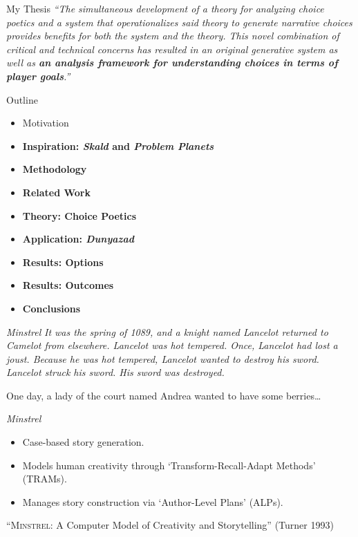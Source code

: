 \documentclass[xcolor=x11names]{beamer}
\def\dunyazad/{\textit{Dunyazad}}
\def\minstrel/{\textit{Minstrel}}
\def\skald/{\textit{Skald}}
\def\problemplanets/{\textit{Problem Planets}}
\begin{document}
\begin{frame}{My Thesis}
  \justifying
  \itshape
  ``The simultaneous development of a theory for analyzing choice poetics and a system that operationalizes said theory to generate narrative choices provides benefits for both the system and the theory. This novel combination of critical and technical concerns has resulted in an original generative system as well as \textbf{an analysis framework for understanding choices in terms of player goals}.''
\end{frame}

\begin{frame}{Outline}
  \begin{itemize}
    \item Motivation
    \item \textbf{Inspiration: \skald/ and \problemplanets/}
    \item \textbf{Methodology}
    \item \textbf{Related Work}
    \item \textbf{Theory: Choice Poetics}
    \item \textbf{Application: \dunyazad/}
    \item \textbf{Results: Options}
    \item \textbf{Results: Outcomes}
    \item \textbf{Conclusions}
  \end{itemize}
\end{frame}

\begin{frame}{\minstrel/}
  \justifying
  \setlength{\parindent}{1.5em}
  \itshape
  It was the spring of 1089, and a knight named Lancelot returned to Camelot from elsewhere. Lancelot was hot tempered. Once, Lancelot had lost a joust. Because he was hot tempered, Lancelot wanted to destroy his sword. Lancelot struck his sword. His sword was destroyed.

  One day, a lady of the court named Andrea wanted to have some berries\ldots
\end{frame}

\begin{frame}{\minstrel/}
  \vfill
  \begin{itemize}\addtolength{\itemsep}{0.5\baselineskip}
    \item Case-based story generation.
    \item Models human creativity through `Transform-Recall-Adapt Methods' (TRAMs).
    \item Manages story construction via `Author-Level Plans' (ALPs).
  \end{itemize}
  \vfill
  \centering
  \tiny ``\textsc{Minstrel}: A Computer Model of Creativity and Storytelling'' (Turner 1993)
\end{frame}
\end{document}
